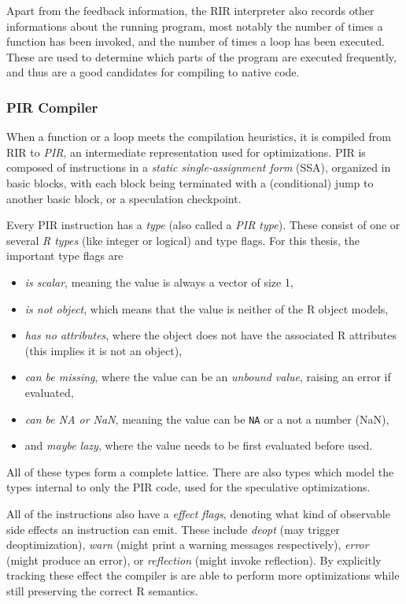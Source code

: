 Apart from the feedback information, the RIR interpreter also records other informations about the running program, most notably the number of times a function has been invoked, and the number of times a loop has been executed. These are used to determine which parts of the program are executed frequently, and thus are a good candidates for compiling to native code.

\subsubsection*{PIR Compiler}

When a function or a loop meets the compilation heuristics, it is compiled from RIR to \textit{PIR}, an intermediate representation used for optimizations. PIR is composed of instructions in a \textit{static single-assignment form} (SSA), organized in basic blocks, with each block being terminated with a (conditional) jump to another basic block, or a speculation checkpoint.

Every PIR instruction has a \textit{type} (also called a \textit{PIR type}). These consist of one or several \textit{R types} (like integer or logical) and type flags. For this thesis, the important type flags are
\begin{itemize}
	\item{} \textit{is scalar}, meaning the value is always a vector of size 1,
	\item{} \textit{is not object}, which means that the value is neither of the R object models,
	\item{} \textit{has no attributes}, where the object does not have the associated R attributes (this implies it is not an object),
	\item{} \textit{can be missing}, where the value can be an \textit{unbound value}, raising an error if evaluated,
	\item{} \textit{can be NA or NaN}, meaning the value can be \texttt{NA} or a not a number (NaN),
	\item{} and \textit{maybe lazy}, where the value needs to be first evaluated before used.
\end{itemize}
All of these types form a complete lattice. There are also types which model the types internal to only the PIR code, used for the speculative optimizations.

All of the instructions also have a \textit{effect flags}, denoting what kind of observable side effects an instruction can emit. These include \textit{deopt} (may trigger deoptimization), \textit{warn} (might print a warning messages respectively), \textit{error} (might produce an error), or \textit{reflection} (might invoke reflection). By explicitly tracking these effect the compiler is are able to perform more optimizations while still preserving the correct R semantics.

